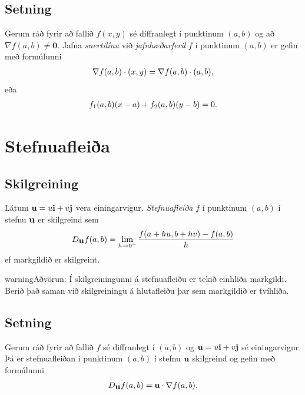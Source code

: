 \documentclass[a4paper,10pt,icelandic]{sphinxmanual}
\begin{document}
\subsection{Setning}
\label{Kafli2:id46}
Gerum ráð fyrir að fallið \(f(x,y)\) sé diffranlegt í punktinum
\((a,b)\) og að \(\nabla f(a,b) \neq \mathbf{0}\). Jafna
\textit{snertilínu} við \textit{jafnhæðarferil} \(f\) í punktinum \((a,b)\) er
gefin með formúlunni
\begin{gather}
\begin{split}\displaystyle \nabla f(a,b)\cdot (x,y)=\nabla f(a,b)\cdot (a,b),\end{split}\notag
\end{gather}
eða
\begin{gather}
\begin{split}\displaystyle f_1(a,b)(x-a)+f_2(a,b)(y-b)=0.\end{split}\notag
\end{gather}

\section{Stefnuafleiða}
\label{Kafli2:index-23}\label{Kafli2:stefnuafleia}

\subsection{Skilgreining}
\label{Kafli2:id47}
Látum \(\mbox{${\bf u}$}=u\mbox{${\bf i}$}+v\mbox{${\bf j}$}\) vera
einingarvigur. \textit{Stefnuafleiða} \(f\) í punktinum \((a,b)\) í
stefnu \(\mbox{${\bf u}$}\) er skilgreind sem
\begin{gather}
\begin{split}\displaystyle D_{\mbox{${\bf u}$}}f(a,b)=\lim_{h\rightarrow 0^+}\frac{f(a+hu, b+hv)-f(a,b)}{h}\end{split}\notag
\end{gather}
ef markgildið er skilgreint.

\begin{notice}{warning}{Aðvörun:}
Í skilgreiningunni á stefnuafleiðu er tekið einhliða markgildi. Berið það saman við skilgreiningu á hlutafleiðu þar sem markgildið er tvíhliða.
\end{notice}


\subsection{Setning}
\label{Kafli2:id48}
Gerum ráð fyrir að fallið \(f\) sé diffranlegt í \((a,b)\) og
\(\mbox{${\bf u}$}=u\mbox{${\bf i}$}+v\mbox{${\bf j}$}\) sé
einingarvigur. Þá er stefnuafleiðan í punktinum \((a,b)\) í stefnu
\(\mbox{${\bf u}$}\) skilgreind og gefin með formúlunni
\begin{gather}
\begin{split}\displaystyle D_{\mbox{${\bf u}$}}f(a,b)=\mbox{${\bf u}$}\cdot \nabla f(a,b).\end{split}\notag
\end{gather}
\end{document}
